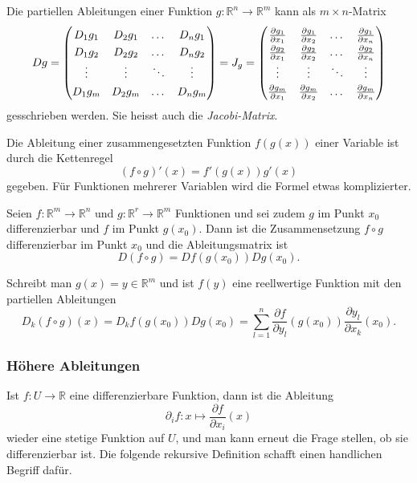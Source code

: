 \begin{definition}
\label{buch:richtungsableitung:def:ableitungsmatrix}
Die partiellen Ableitungen einer Funktion
$g\colon\mathbb{R}^n\to\mathbb{R}^m$
kann als $m\times n$-Matrix
\[
Dg
=
\begin{pmatrix}
D_1g_1 & D_2g_1 & \dots  & D_ng_1 \\
D_1g_2 & D_2g_2 & \dots  & D_ng_2 \\
\vdots & \vdots & \ddots & \vdots \\
D_1g_m & D_2g_m & \dots  & D_ng_m
\end{pmatrix}
=
J_g
=
{\renewcommand{\arraystretch}{1.3}
\begin{pmatrix}
\frac{\partial g_1}{\partial x_1}
	& \frac{\partial g_1}{\partial x_2}
		&\dots
			&\frac{\partial g_1}{\partial x_n}
\\
\frac{\partial g_2}{\partial x_1}
	& \frac{\partial g_2}{\partial x_2}
		&\dots
			&\frac{\partial g_2}{\partial x_n}
\\
\vdots	&\vdots	&\ddots	&\vdots \\
\frac{\partial g_m}{\partial x_1}
	& \frac{\partial g_m}{\partial x_2}
		&\dots
			&\frac{\partial g_m}{\partial x_n}
\end{pmatrix}}
\]
gesschrieben werden.
Sie heisst auch die {\em Jacobi-Matrix}.
%
\end{definition}

Die Ableitung einer zusammengesetzten Funktion $f(g(x))$ einer 
Variable ist durch die Kettenregel
\[
(f\circ g)'(x)
=
f'(g(x)) g'(x)
\]
gegeben.
Für Funktionen mehrerer Variablen wird die Formel etwas komplizierter.

\begin{satz}
Seien $f\colon \mathbb{R}^m\to\mathbb{R}^n$ und
$g\colon\mathbb{R}^r\to\mathbb{R}^m$ Funktionen und sei zudem
$g$ im Punkt $x_0$ differenzierbar und $f$ im Punkt $g(x_0)$.
Dann ist die Zusammensetzung $f\circ g$ differenzierbar im Punkt $x_0$
und die Ableitungsmatrix ist
\[
D(f\circ g) = Df(g(x_0)) Dg(x_0).
\]
\end{satz}

Schreibt man $g(x)=y\in\mathbb{R}^m$ und ist $f(y)$ eine reellwertige Funktion
mit den partiellen Ableitungen
\[
D_k(f\circ g)(x)
=
D_kf(g(x_0)) Dg(x_0)
=
\sum_{l=1}^n
\frac{\partial f}{\partial y_l}(g(x_0))
\frac{\partial y_l}{\partial x_k}(x_0).
\]

%
%
\subsubsection{Höhere Ableitungen}
Ist $f\colon U\to\mathbb{R}$ eine differenzierbare Funktion, dann ist
die Ableitung
\[
\partial_if\colon x\mapsto \frac{\partial f}{\partial x_i}(x)
\]
wieder eine stetige Funktion auf $U$, und man kann erneut die Frage
stellen, ob sie differenzierbar ist.
Die folgende rekursive Definition schafft einen handlichen Begriff
dafür.

